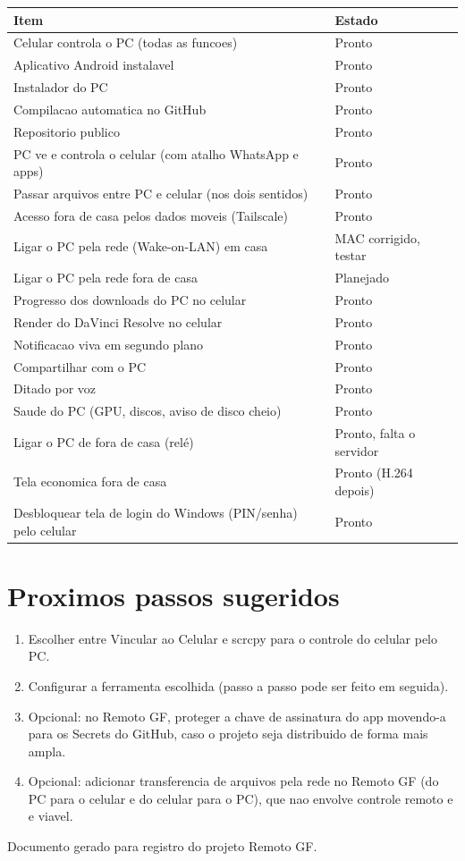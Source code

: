 \documentclass[11pt,a4paper]{article}
\begin{document}
\begin{center}
\begin{tabular}{@{}p{8.5cm}l@{}}
\toprule
\textbf{Item} & \textbf{Estado} \\
\midrule
Celular controla o PC (todas as funcoes) & Pronto \\
Aplicativo Android instalavel & Pronto \\
Instalador do PC & Pronto \\
Compilacao automatica no GitHub & Pronto \\
Repositorio publico & Pronto \\
PC ve e controla o celular (com atalho WhatsApp e apps) & Pronto \\
Passar arquivos entre PC e celular (nos dois sentidos) & Pronto \\
Acesso fora de casa pelos dados moveis (Tailscale) & Pronto \\
Ligar o PC pela rede (Wake-on-LAN) em casa & MAC corrigido, testar \\
Ligar o PC pela rede fora de casa & Planejado \\
Progresso dos downloads do PC no celular & Pronto \\
Render do DaVinci Resolve no celular & Pronto \\
Notificacao viva em segundo plano & Pronto \\
Compartilhar com o PC & Pronto \\
Ditado por voz & Pronto \\
Saude do PC (GPU, discos, aviso de disco cheio) & Pronto \\
Ligar o PC de fora de casa (relé) & Pronto, falta o servidor \\
Tela economica fora de casa & Pronto (H.264 depois) \\
Desbloquear tela de login do Windows (PIN/senha) pelo celular & Pronto \\
\bottomrule
\end{tabular}
\end{center}

\section{Proximos passos sugeridos}

\begin{enumerate}
  \item Escolher entre Vincular ao Celular e scrcpy para o controle do celular pelo PC.
  \item Configurar a ferramenta escolhida (passo a passo pode ser feito em seguida).
  \item Opcional: no Remoto GF, proteger a chave de assinatura do app movendo-a para os
  Secrets do GitHub, caso o projeto seja distribuido de forma mais ampla.
  \item Opcional: adicionar transferencia de arquivos pela rede no Remoto GF (do PC para o
  celular e do celular para o PC), que nao envolve controle remoto e e viavel.
\end{enumerate}

\vfill
\begin{center}
\color{cinza}\small Documento gerado para registro do projeto Remoto GF.
\end{center}
\end{document}

